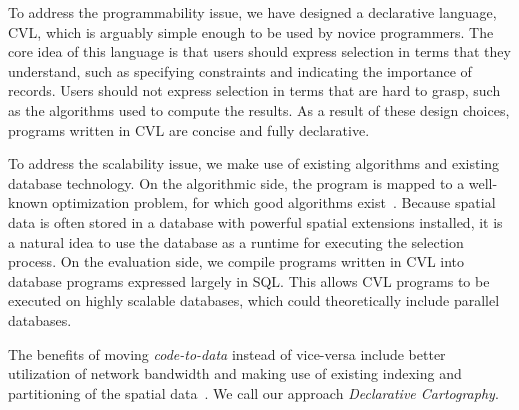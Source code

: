 To address the programmability issue, we have designed a declarative language, CVL, which is arguably simple enough to be used by novice programmers. The core idea of this language is that users should express selection in terms that they understand, such as specifying constraints and indicating the importance of records. Users should not express selection in terms that are hard to grasp, such as the algorithms used to compute the results. As a result of these design choices, programs written in CVL are concise and fully declarative.

To address the scalability issue, we make use of existing algorithms and existing database technology. On the algorithmic side, the program is mapped to a well-known optimization problem, for which good algorithms exist~\cite{rajagopalan1998primal}. Because spatial data is often stored in a database with powerful spatial extensions installed, it is a natural idea to use the database as a runtime for executing the selection process. On the evaluation side, we compile programs written in CVL into database programs expressed largely in SQL. This allows CVL programs to be executed on highly scalable databases, which could theoretically include parallel databases. 

The benefits of moving \emph{code-to-data} instead of vice-versa include better utilization of network bandwidth and making use of existing indexing and partitioning of the spatial data~\cite{Guttman1984:RTree,Hellerstein1995:GiST}. We call our approach \emph{Declarative Cartography}.

\vspace{5em}

